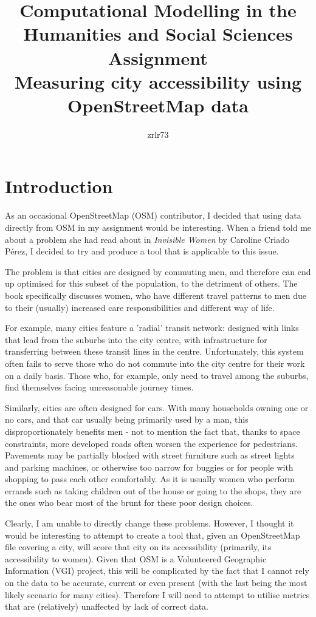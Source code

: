 \documentclass[11pt]{article} %
\title{\vspace{-1.6cm}Computational Modelling in the Humanities and Social Sciences Assignment \\
	\vspace{0.5cm}\large Measuring city accessibility using OpenStreetMap data\vspace{-0.3cm}}
\author{zrlr73}
\date{} %
\begin{document}
\maketitle

\section{Introduction}

As an occasional OpenStreetMap (OSM) contributor, I decided that using data directly from OSM in my assignment would be interesting. When a friend told me about a problem she had read about in \textit{Invisible Women} by Caroline Criado Pérez, I decided to try and produce a tool that is applicable to this issue.

The problem is that cities are designed by commuting men, and therefore can end up optimised for this subset of the population, to the detriment of others. The book specifically discusses women, who have different travel patterns to men due to their (usually) increased care responsibilities and different way of life.

For example, many cities feature a 'radial' transit network: designed with links that lead from the suburbs into the city centre, with infrastructure for transferring between these transit lines in the centre. Unfortunately, this system often fails to serve those who do not commute into the city centre for their work on a daily basis. Those who, for example, only need to travel among the suburbs, find themselves facing unreasonable journey times.

Similarly, cities are often designed for cars. With many households owning one or no cars, and that car usually being primarily used by a man, this disproportionately benefits men - not to mention the fact that, thanks to space constraints, more developed roads often worsen the experience for pedestrians. Pavements may be partially blocked with street furniture such as street lights and parking machines, or otherwise too narrow for buggies or for people with shopping to pass each other comfortably. As it is usually women who perform errands such as taking children out of the house or going to the shops, they are the ones who bear most of the brunt for these poor design choices.

Clearly, I am unable to directly change these problems. However, I thought it would be interesting to attempt to create a tool that, given an OpenStreetMap file covering a city, will score that city on its accessibility (primarily, its accessibility to women). Given that OSM is a Volunteered Geographic Information (VGI) project, this will be complicated by the fact that I cannot rely on the data to be accurate, current or even present (with the last being the most likely scenario for many cities). Therefore I will need to attempt to utilise metrics that are (relatively) unaffected by lack of correct data.
\end{document}
